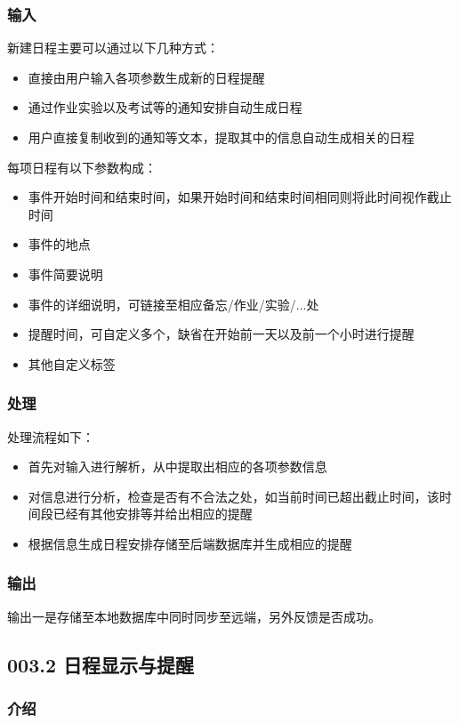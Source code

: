     \subsubsection{输入}
    新建日程主要可以通过以下几种方式：
    \begin{itemize}
      \item 直接由用户输入各项参数生成新的日程提醒
      \item 通过作业实验以及考试等的通知安排自动生成日程
      \item 用户直接复制收到的通知等文本，提取其中的信息自动生成相关的日程
    \end{itemize}
    每项日程有以下参数构成：
    \begin{itemize}
      \item 事件开始时间和结束时间，如果开始时间和结束时间相同则将此时间视作截止时间
      \item 事件的地点
      \item 事件简要说明
      \item 事件的详细说明，可链接至相应备忘/作业/实验/...处
      \item 提醒时间，可自定义多个，缺省在开始前一天以及前一个小时进行提醒
      \item 其他自定义标签
    \end{itemize}
    \subsubsection{处理}
    处理流程如下：
    \begin{itemize}
      \item 首先对输入进行解析，从中提取出相应的各项参数信息
      \item 对信息进行分析，检查是否有不合法之处，如当前时间已超出截止时间，该时间段已经有其他安排等并给出相应的提醒
      \item 根据信息生成日程安排存储至后端数据库并生成相应的提醒
    \end{itemize}
    \subsubsection{输出}
    输出一是存储至本地数据库中同时同步至远端，另外反馈是否成功。

  \subsection{003.2 日程显示与提醒}
    \subsubsection{介绍}

